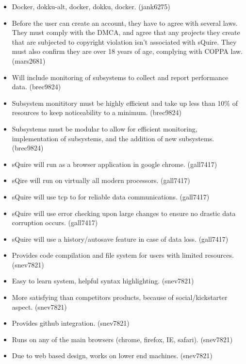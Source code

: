 \documentclass[11pt]{report}
\begin{document}
\begin{itemize}
            \item Docker, dokku-alt, docker, dokku, docker. (jank6275)
            \item Before the user can create an account, they have to agree with several laws. They must comply with the DMCA, and agree that any projects they create that are subjected to copyright violation isn’t associated with sQuire. They must also confirm they are over 18 years of age, complying with COPPA law. (mars2681)
            \item Will include monitoring of subsystems to collect and report performance data. (brec9824)
            \item Subsystem monititory must be highly efficient and take up less than 10\% of resources to keep noticeability to a minimum. (brec9824)
            \item Subsystems must be modular to allow for efficient monitoring, implementation of subsystems, and the addition of new subsystems. (brec9824)
            \item sQuire will run as a browser application in google chrome. (gall7417)
            \item sQire will run on virtually all modern processors. (gall7417)
            \item sQuire will use tcp to for reliable data communications. (gall7417)
            \item sQuire will use error checking upon large changes to ensure no drastic data corruption occurs. (gall7417)
            \item sQuire will use a history/autosave feature in case of data loss. (gall7417)
            \item Provides code compilation and file system for users with limited resources. (snev7821)
            \item Easy to learn system, helpful syntax highlighting. (snev7821)
            \item More satisfying than competitors products, because of social/kickstarter aspect. (snev7821)
            \item Provides github integration. (snev7821)
            \item Runs on any of the main browsers (chrome, firefox, IE, safari). (snev7821)
            \item Due to web based design, works on lower end machines. (snev7821)
    \end{itemize}
\end{document}
